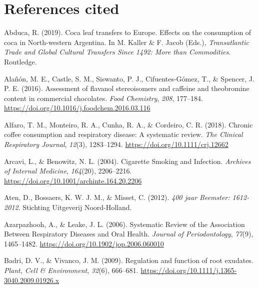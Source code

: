 \documentclass[
  b5paper,
]{book}
\newlength{\cslhangindent}
\newlength{\cslentryspacingunit} %
\newenvironment{CSLReferences}[2] %
 {%
  \setlength{\parindent}{0pt}
  \ifodd #1
  \let\oldpar\par
  \def\par{\hangindent=\cslhangindent\oldpar}
  \fi
  \setlength{\parskip}{#2\cslentryspacingunit}
 }%
 {}
\begin{document}
\hypertarget{references-cited-4}{%
\section*{References cited}\label{references-cited-4}}


\hypertarget{refs-5}{}
\begin{CSLReferences}{1}{0}
\leavevmode{}%
Abduca, R. (2019). Coca leaf transfers to {Europe}. {Effects} on the
consumption of coca in {North-western Argentina}. In M. Kaller \& F.
Jacob (Eds.), \emph{Transatlantic {Trade} and {Global Cultural Transfers
Since} 1492: {More} than {Commodities}}. {Routledge}.

\leavevmode{}%
Alañón, M. E., Castle, S. M., Siswanto, P. J., Cifuentes-Gómez, T., \&
Spencer, J. P. E. (2016). Assessment of flavanol stereoisomers and
caffeine and theobromine content in commercial chocolates. \emph{Food
Chemistry}, \emph{208}, 177--184.
\url{https://doi.org/10.1016/j.foodchem.2016.03.116}

\leavevmode{}%
Alfaro, T. M., Monteiro, R. A., Cunha, R. A., \& Cordeiro, C. R. (2018).
Chronic coffee consumption and respiratory disease: {A} systematic
review. \emph{The Clinical Respiratory Journal}, \emph{12}(3),
1283--1294. \url{https://doi.org/10.1111/crj.12662}

\leavevmode{}%
Arcavi, L., \& Benowitz, N. L. (2004). Cigarette {Smoking} and
{Infection}. \emph{Archives of Internal Medicine}, \emph{164}(20),
2206--2216. \url{https://doi.org/10.1001/archinte.164.20.2206}

\leavevmode{}%
Aten, D., Bossaers, K. W. J. M., \& Misset, C. (2012). \emph{{400 jaar
Beemster: 1612-2012}}. {Stichting Uitgeverij Noord-Holland}.

\leavevmode{}%
Azarpazhooh, A., \& Leake, J. L. (2006). Systematic {Review} of the
{Association Between Respiratory Diseases} and {Oral Health}.
\emph{Journal of Periodontology}, \emph{77}(9), 1465--1482.
\url{https://doi.org/10.1902/jop.2006.060010}

\leavevmode{}%
Badri, D. V., \& Vivanco, J. M. (2009). Regulation and function of root
exudates. \emph{Plant, Cell \& Environment}, \emph{32}(6), 666--681.
\url{https://doi.org/10.1111/j.1365-3040.2009.01926.x}


\end{CSLReferences}
\end{document}
